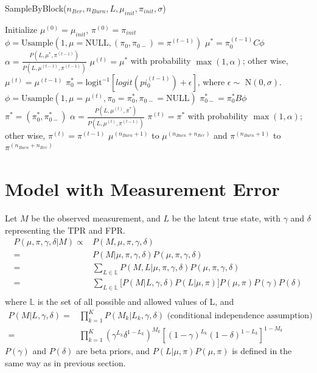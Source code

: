 \documentclass[11 pt, a4paper]{article}  %
\begin{document}
\begin{algorithm}[H]
\caption{SampleByBlock($n_{Iter}, n_{Burn}, L, \mu_{init}, \pi_{init}, \sigma$)}
\begin{algorithmic}[1]
\State Initialize $\mu^{(0)} = \mu_{init}$, $\pi^{(0)} = \pi_{init}$
\State $\phi = \text{Usample} (1, \mu=\text{NULL}, (\pi_0,\pi_{0-})=\pi^{(t-1)})$
\State $\mu^* = \pi_0^{(t-1)} C \phi $
\State $\alpha = \frac{P(L, \mu^*, \pi^{(t-1)} )}{P(L, \mu^{(t-1)}, \pi^{(t-1)} )}$
\State $\mu^{(t)} = \mu^*$ with probability $\max(1, \alpha)$; other wise, $\mu^{(t)} = \mu^{(t-1)}$
\State $\pi^*_{0} = \text{logit}^{-1}[logit(pi_{0}^{(t-1)}) + \epsilon]$, where $\epsilon \sim $ N$(0, \sigma)$.
\State $\phi = \text{Usample} (1, \mu=\mu^{(t)}, \pi_0=\pi^*_{0},\pi_{0-}=\text{NULL})$
\State $\pi^*_{0-} = \pi^*_{0} B \phi$
\State $\pi^* = (\pi^*_{0}, \pi^*_{0-})$
\State $\alpha = \frac{P(L, \mu^{(t)}, \pi^* )}{P(L, \mu^{(t)}, \pi^{(t-1)} )}$
\State $\pi^{(t)} = \pi^*$ with probability $\max(1, \alpha)$; other wise, $\pi^{(t)} = \pi^{(t-1)} $
\EndFor
{} $\mu^{(n_{Burn}+1)}$ to $\mu^{(n_{Burn} + n_{Iter})}$ and $\pi^{(n_{Burn}+1)}$ to $\pi^{(n_{Burn} + n_{Iter})}$
\end{algorithmic}
\end{algorithm}

\newpage
\section{Model with Measurement Error}
Let $M$ be the observed measurement, and $L$ be the latent true state, with $\gamma$ and $\delta$ representing the TPR and FPR.
\begin{align*}
P(\mu, \pi , \gamma, \delta|M) \propto & P(M, \mu, \pi, \gamma, \delta) \\
= & P(M | \mu, \pi, \gamma, \delta) P(\mu, \pi, \gamma, \delta) \\
= & \sum_{L \in \mathbb{L}}  P(M, L | \mu, \pi, \gamma, \delta) P(\mu, \pi, \gamma, \delta) \\ 
= & \sum_{L \in \mathbb{L}} \big[ P(M | L, \gamma, \delta) P(L | \mu, \pi) \big ] P(\mu, \pi) P(\gamma) P(\delta) \\ 
\end{align*}
where $\mathbb{L}$ is the set of all possible and allowed values of L, and
\begin{align*}
 P(M | L, \gamma, \delta) = & \prod_{k=1}^K P(M_k | L_k, \gamma, \delta) \text{\ \ (conditional independence assumption)}\\
 = & \prod_{k=1}^K (\gamma^{L_k} \delta^{1-L_k})^{M_k} [(1-\gamma)^{L_k} (1-\delta)^{1-L_k}]^{1-M_k}
\end{align*}
$P(\gamma)$ and $ P(\delta)$ are beta priors, and $P(L | \mu, \pi)  P(\mu, \pi)$ is defined in the same way as in previous section.
\end{document}
